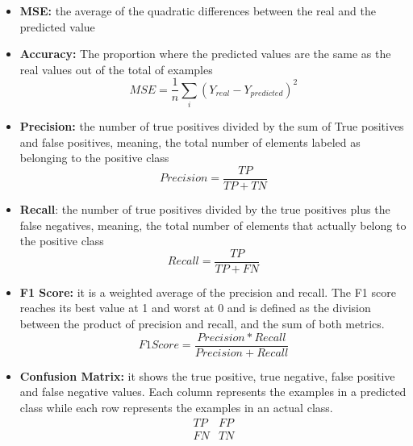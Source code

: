 \begin{itemize}
\item \textbf{MSE:} the average of the quadratic differences between the real and the predicted value
\item \textbf{Accuracy:} The proportion where the predicted values are the same as the real values out of the total of examples
\begin{equation}
MSE=\frac{1}{n}\sum_i (Y_{real}-Y_{predicted})^2
\label{eq:msemet}
\end{equation}
\item \textbf{Precision:} the number of true positives divided by the sum of True positives and false positives, meaning, the total number of elements labeled as belonging to the positive class 
\begin{equation}
Precision=\frac{TP}{TP+TN}
\label{eq:precision}
\end{equation}
\item \textbf{Recall}: the number of true positives divided by the true positives plus the false negatives, meaning, the total number of elements that actually belong to the positive class
\begin{equation}
Recall=\frac{TP}{TP+FN}
\label{eq:recall}
\end{equation}
\item \textbf{F1 Score:} it is a weighted average of the precision and recall. The F1 score reaches its best value at 1 and worst at 0 and is defined as the division between the product of precision and recall, and the sum of both metrics.
\begin{equation}
F1 Score=\frac{Precision*Recall}{Precision+Recall}
\label{eq:fiscore}
\end{equation}
\item \textbf{Confusion Matrix:} it shows the true positive, true negative, false positive and false negative values. Each column represents the examples in a predicted class while each row represents the examples in an actual class.
$$
\begin{matrix}
TP&FP\\
FN&TN\\
\end{matrix}
$$
\end{itemize}

























